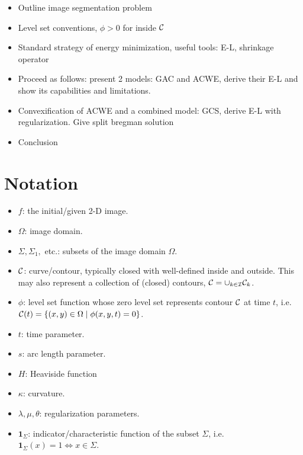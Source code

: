 \begin{itemize}
	\item Outline image segmentation problem 
	
	\item Level set conventions, $\phi>0$ for inside $\mathcal{C}$
	
	\item Standard strategy of energy minimization, useful tools: E-L, shrinkage operator
	
	\item Proceed as follows: present 2 models: GAC and ACWE, derive their E-L and show its capabilities and limitations.
	
	\item Convexification of ACWE and a combined model: GCS, derive E-L with regularization. Give split bregman solution
	
	\item Conclusion
\end{itemize}

\section{Notation}
\begin{itemize}
	\item $f$: the initial/given 2-D image.
	
	\item $\Omega$: image domain.
	
	\item $\Sigma, \Sigma_1,$ etc.: subsets of the image domain $\Omega$.
	
	\item $\mathcal{C}$: curve/contour, typically closed with well-defined inside and outside. This may also represent a collection of (closed) contours, $\mathcal{C} = \cup_{k \in \mathcal{I}} \mathcal{C}_k$.
	
	\item $\phi$: level set function whose zero level set represents contour $\mathcal{C}$ at time $t$, i.e. $\mathcal{C}(t) = \{(x,y) \in \Omega \mid \phi(x,y,t) = 0\}$. 
	
	\item $t$: time parameter. 
	
	\item $s$: arc length parameter.
	
	\item $H$: Heaviside function
	
	\item $\kappa$: curvature. 
	
	\item $\lambda, \mu, \theta$: regularization parameters.
	
	\item $\mathbf{1}_\Sigma$: indicator/characteristic function of the subset $\Sigma$, i.e. $\mathbf{1}_\Sigma(x) = 1 \iff x \in \Sigma$.
	
\end{itemize}